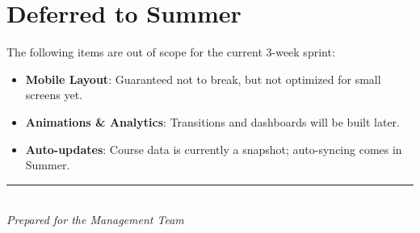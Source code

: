 \documentclass[11pt]{article}
\begin{document}
\vspace{-0.2cm}
\section{Deferred to Summer}
\vspace{-0.3cm}
The following items are out of scope for the current 3-week sprint:
\begin{itemize}[noitemsep, nolistsep]
    \item \textbf{Mobile Layout}: Guaranteed not to break, but not optimized for small screens yet. 
    \item \textbf{Animations \& Analytics}: Transitions and dashboards will be built later.
    \item \textbf{Auto-updates}: Course data is currently a snapshot; auto-syncing comes in Summer.
\end{itemize}

\vspace{0.5cm}
\begin{center}
\rule{0.5\textwidth}{0.4pt} \\
\textit{\small Prepared for the Management Team}
\end{center}
\end{document}

